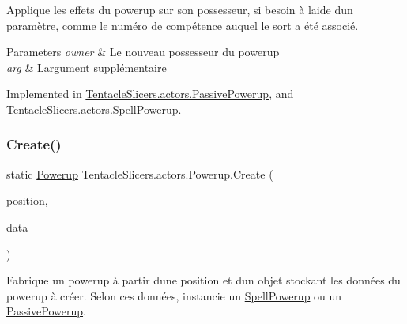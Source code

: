 Applique les effets du powerup sur son possesseur, si besoin à l\textquotesingle{}aide d\textquotesingle{}un paramètre, comme le numéro de compétence auquel le sort a été associé. 


\begin{DoxyParams}{Parameters}
{\em owner} & Le nouveau possesseur du powerup \\
\hline
{\em arg} & L\textquotesingle{}argument supplémentaire \\
\hline
\end{DoxyParams}


Implemented in \hyperlink{class_tentacle_slicers_1_1actors_1_1_passive_powerup_a73aed325e29e372952cf46add5377b57}{Tentacle\+Slicers.\+actors.\+Passive\+Powerup}, and \hyperlink{class_tentacle_slicers_1_1actors_1_1_spell_powerup_ad779a4a5ca4ccb8895f40f8a5f64dad3}{Tentacle\+Slicers.\+actors.\+Spell\+Powerup}.

\mbox{\label{class_tentacle_slicers_1_1actors_1_1_powerup_a170bfc9101d384a73957470249458cfc}} 
\subsubsection{\texorpdfstring{Create()}{Create()}}
{\footnotesize\ttfamily static \hyperlink{class_tentacle_slicers_1_1actors_1_1_powerup}{Powerup} Tentacle\+Slicers.\+actors.\+Powerup.\+Create (\begin{DoxyParamCaption}\item[{Point}]{position,  }\item[{\hyperlink{class_tentacle_slicers_1_1actors_1_1_powerup_data}{Powerup\+Data}}]{data }\end{DoxyParamCaption})\hspace{0.3cm}{\ttfamily [static]}}



Fabrique un powerup à partir d\textquotesingle{}une position et d\textquotesingle{}un objet stockant les données du powerup à créer. Selon ces données, instancie un \hyperlink{class_tentacle_slicers_1_1actors_1_1_spell_powerup}{Spell\+Powerup} ou un \hyperlink{class_tentacle_slicers_1_1actors_1_1_passive_powerup}{Passive\+Powerup}. 


